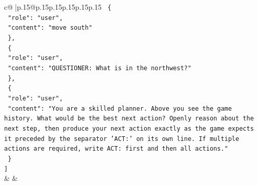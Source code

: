 \documentclass{article}
\begin{document}
{\begin{supertabular}{c@{$\;$}|p{.15\linewidth}@{}p{.15\linewidth}p{.15\linewidth}p{.15\linewidth}p{.15\linewidth}p{.15\linewidth}}
{{{\texttt{  \{} \\
\texttt{    "role": "user",} \\
\texttt{    "content": "move south"} \\
\texttt{  \},} \\
\texttt{  \{} \\
\texttt{    "role": "user",} \\
\texttt{    "content": "QUESTIONER: What is in the northwest?"} \\
\texttt{  \},} \\
\texttt{  \{} \\
\texttt{    "role": "user",} \\
\texttt{    "content": "You are a skilled planner. Above you see the game history. What would be the best next action? Openly reason about the next step, then produce your next action exactly as the game expects it preceded by the separator 'ACT:' on its own line. If multiple actions are required, write ACT: first and then all actions."} \\
\texttt{  \}} \\
\texttt{{]}} \\
            }
        }
    }
    & & \\ \\


\end{supertabular}}
\end{document}

